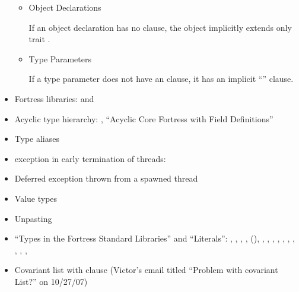 \begin{itemize}
\begin{itemize}
\item %
 Object Declarations

If an object declaration has no  clause,
the object implicitly extends only trait .

\item {} Type Parameters

If a type parameter does not have an  clause, it has an
implicit ``'' clause.

 \end{itemize}

\item Fortress libraries:
  and 

 \item Acyclic type hierarchy: ,
 ``Acyclic Core Fortress with Field Definitions''


\item Type aliases

\item {} exception in early termination of threads:

\item Deferred exception thrown from a spawned thread

\item Value types%

\item Unpasting

\item ``Types in the Fortress Standard Libraries'' and ``Literals'':
, , , ,
 (),
, ,
   , , ,
 ,
   , ,
   , , 

\item Covariant list with  clause (Victor's email titled
``Problem with covariant List?'' on 10/27/07)


\end{itemize}
